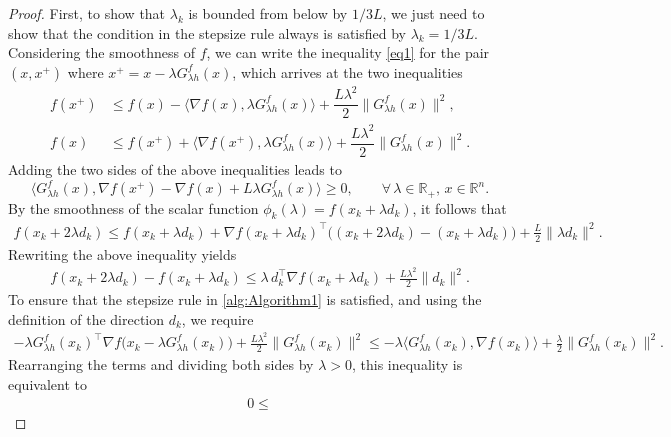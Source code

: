 \documentclass[10pt,a4paper]{amsart}
\begin{document}
\begin{proof}
First, to show that $\lambda_k$ is bounded from below by ${1}/{3L}$, we just need to show that the condition in the stepsize rule always is satisfied by $\lambda_k = 1/{3L}$. Considering the smoothness of $f$, we can write the inequality \eqref{eq1} for the pair $(x,x^+)$ where $x^+ = x - \lambda G^{f}_{\lambda h}(x)$, which arrives at the two inequalities
\begin{align*}
f(x^+) &\leq f(x) - \langle \nabla f(x),\lambda G^{f}_{\lambda h}(x) \rangle + \dfrac{L\lambda ^2}{2} \|G^{f}_{\lambda h}(x)\|^2, \\
f(x) &\leq f(x^+) + \langle \nabla f(x^+),\lambda G^{f}_{\lambda h}(x) \rangle + \dfrac{L\lambda ^2}{2} \|G^{f}_{\lambda h}(x)\|^2.
\end{align*}
Adding the two sides of the above inequalities leads to
\begin{equation}\label{eq4}
\langle G^{f}_{\lambda h}(x), \nabla f(x^+) - \nabla f(x) + {L\lambda}G^{f}_{\lambda h}(x) \rangle \geq 0, \qquad \forall \, \lambda \in \mathbb{R}_+, \, x \in \mathbb{R}^n.   
\end{equation}
{By the smoothness of the scalar function $\phi_k(\lambda) = f(x_k + \lambda d_k)$, it follows that
\begin{align*}
    f(x_k + 2\lambda d_k)
    \leq f(x_k + \lambda d_k)
    + \nabla f(x_k + \lambda d_k)^\top \bigl( (x_k + 2\lambda d_k) - (x_k + \lambda d_k) \bigr)
    + \frac{L}{2}\|\lambda d_k\|^2.
\end{align*}
Rewriting the above inequality yields
\begin{align*}
    f(x_k + 2\lambda d_k) - f(x_k + \lambda d_k)
    \leq \lambda\, d_k^\top \nabla f(x_k + \lambda d_k)
    + \frac{L\lambda^2}{2}\|d_k\|^2.
\end{align*}
To ensure that the stepsize rule in \ref{alg:Algorithm1} is satisfied, and using the definition of the direction $d_k$, we require
{\color{black}
\begin{align*}
    - \lambda G^{f}_{\lambda h}(x_k)^\top
    \nabla f\bigl(x_k - \lambda G^{f}_{\lambda h}(x_k)\bigr)
    + \frac{L\lambda^2}{2}\|G^{f}_{\lambda h}(x_k)\|^2
    \leq
    - \lambda \langle G^{f}_{\lambda h}(x_k), \nabla f(x_k) \rangle
    + \frac{\lambda}{2}\|G^{f}_{\lambda h}(x_k)\|^2.
\end{align*}
Rearranging the terms and dividing both sides by $\lambda>0$, this inequality is equivalent to}
\begin{align}\label{thr2_3_ineq1}
    0 \leq

\end{align}}
\end{proof}
\end{document}
